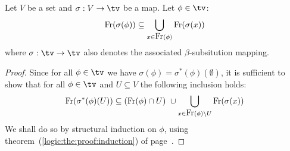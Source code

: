 \begin{prop}\label{logic:prop:LAM:subst:free}
Let $V$ be a set and $\sigma:V\to\tv$ be a map. Let $\phi\in\tv$:
    \[
    \mbox{\rm Fr}(\sigma(\phi))\subseteq\bigcup_{x\in\mbox{\rm Fr}(\phi)} \mbox{\rm Fr}(\sigma(x))
    \]
where $\sigma:\tv\to\tv$ also denotes the associated $\beta$-subsitution mapping.
\end{prop}
\begin{proof}
Since for all $\phi\in\tv$ we have $\sigma(\phi)=\sigma^{*}(\phi)(\emptyset)$, it is sufficient to show that for all $\phi\in\tv$ and $U\subseteq V$ the following
inclusion holds:
    \begin{equation}\label{logic:eqn:LAM:subst:free}
        \mbox{\rm Fr}(\sigma^{*}(\phi)(U)) \subseteq (\mbox{\rm Fr}(\phi)\cap U)\ \cup
        \bigcup_{x\in\mbox{\rm Fr}(\phi)\setminus U} \mbox{\rm Fr}(\sigma(x))
    \end{equation}
We shall do so by structural induction on $\phi$, using
theorem~(\ref{logic:the:proof:induction}) of 
page~\pageref{logic:the:proof:induction}.
\end{proof}




